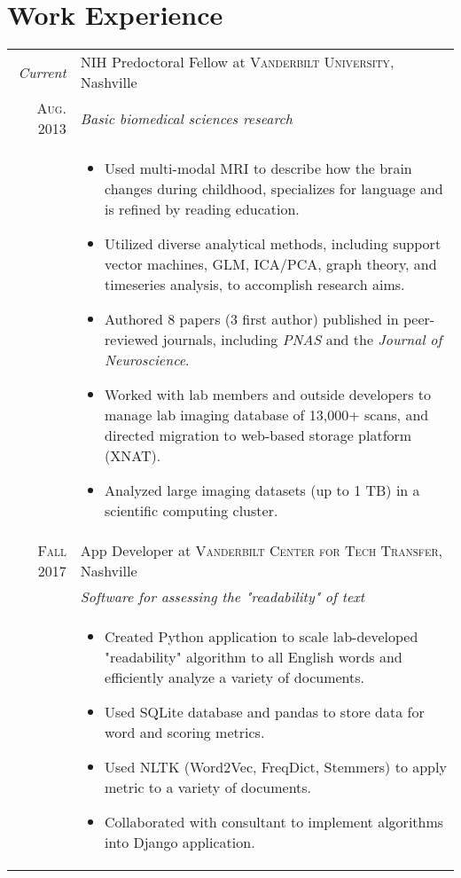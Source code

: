 \documentclass[a4paper,10pt]{article}
\begin{document}
\section{Work Experience}
\begin{tabular}{r|p{11cm}}
 

 
 	\emph{Current} & NIH Predoctoral Fellow at \textsc{Vanderbilt University}, Nashville \\
 	\textsc{Aug. 2013}&\emph{Basic biomedical sciences research}\\
 	&\footnotesize{
 	\begin{itemize}
    	\item Used multi-modal MRI to describe how the brain changes during childhood, specializes for language and is refined by reading education.
    	\item Utilized diverse analytical methods, including support vector machines, GLM, ICA/PCA, graph theory, and timeseries analysis, to accomplish research aims.
        \item Authored 8 papers (3 first author) published in peer-reviewed journals,  including  \textit{PNAS} and the  \textit{Journal of Neuroscience}.
        \item Worked with lab members and outside developers to manage lab imaging database of 13,000+ scans, and directed migration to web-based storage platform (XNAT).
        \item Analyzed large imaging datasets (up to 1 TB) in a scientific computing cluster.
	\end{itemize}}\\
    
	\textsc{Fall} 2017 & App Developer at \textsc{Vanderbilt Center for Tech Transfer}, Nashville \\
	&\emph{Software for assessing the "readability" of text}\\
	&\footnotesize{
	\begin{itemize}
	    \item Created Python application to scale lab-developed "readability" algorithm to all English words and efficiently analyze a variety of documents. 
	    \item Used SQLite database and pandas to store data for word and scoring metrics.
	    \item Used NLTK (Word2Vec, FreqDict, Stemmers) to apply metric to a variety of documents.
	    \item Collaborated with consultant to implement algorithms into Django application. 
    \end{itemize}}\\


\end{tabular}
\end{document}

